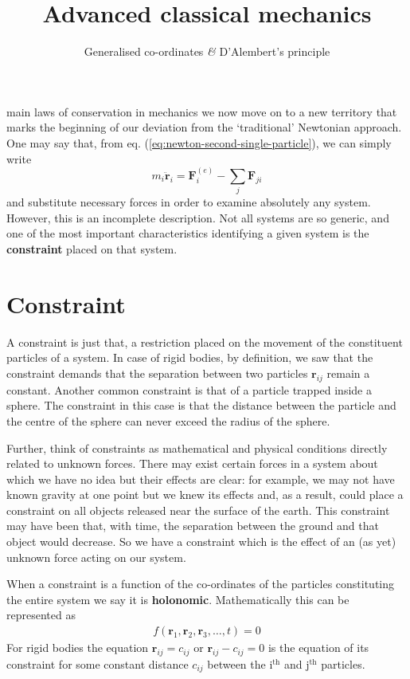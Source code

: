 \documentclass[english,seminar,headertitle]{lecture}
\title{Advanced classical mechanics}
\subtitle{Generalised co-ordinates \textit{\&} D'Alembert's principle}
\author{}
\date{}{}{}
\begin{document}
%
\newcommand{\act}{S[\mathbf{r}]}
\newcommand{\dt}{\textrm{d}t\;}
\renewcommand{\th}[1]{#1$^\textrm{th}$}
%
\noindent{} main laws of conservation in mechanics we now move on to a new territory that marks the beginning of our deviation from the `traditional' Newtonian approach. One may say that, from eq. (\ref{eq:newton-second-single-particle}), we can simply write $$m_i\mathbf{\ddot{r}}_i = \mathbf{F}_i^{(e)} - \sum_j\mathbf{F}_{ji}$$and substitute necessary forces in order to examine absolutely any system. However, this is an incomplete description. Not all systems are so generic, and one of the most important characteristics identifying a given system is the \textbf{constraint} placed on that system.

\section{Constraint}\label{sec:constraint}

A constraint is just that, a restriction placed on the movement of the constituent particles of a system. In case of rigid bodies, by definition, we saw that the constraint demands that the separation between two particles $\mathbf{r}_{ij}$ remain a constant. Another common constraint is that of a particle trapped inside a sphere. The constraint in this case is that the distance between the particle and the centre of the sphere can never exceed the radius of the sphere.

Further, think of constraints as mathematical and physical conditions directly related to unknown forces. There may exist certain forces in a system about which we have no idea but their effects are clear: for example, we may not have known gravity at one point but we knew its effects and, as a result, could place a constraint on all objects released near the surface of the earth. This constraint may have been that, with time, the separation between the ground and that object would decrease. So we have a constraint which is the effect of an (as yet) unknown force acting on our system.

When a constraint is a function of the co-ordinates of the particles constituting the entire system we say it is \textbf{holonomic}. Mathematically this can be represented as
\begin{align}
	f(\mathbf{r}_1, \mathbf{r}_2, \mathbf{r}_3, \ldots, t) = 0 \label{eq:holonomic}
\end{align}%
For rigid bodies the equation $\mathbf{r}_{ij} = c_{ij}$ or $\mathbf{r}_{ij} - c_{ij} = 0$ is the equation of its constraint for some constant distance $c_{ij}$ between the \th{i} and \th{j} particles.
\end{document}
